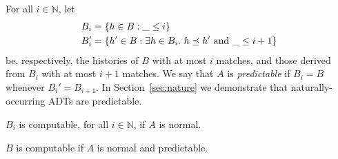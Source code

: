 For all $i \in \mathbb{N}$, let
\begin{align*}
  B_i &= {\{{ h \in B : \_ \le i }\}} \\
  B_i' &= {\{{ h' \in B :
    \exists h \in B_i.\ h \preceq h' \text{ and } \_ \le i+1
  }\}}
\end{align*}
be, respectively, the histories of $B$ with at most $i$ matches, and those
derived from $B_i$ with at most $i\!+\!1$ matches. We say that $A$ is
\emph{predictable} if $B_i = B$ whenever $B_i' = B_{i+1}$. In 
Section~\ref{sec:nature} we demonstrate that naturally-occurring ADTs are
predictable.

\begin{lemma}

  $B_i$ is computable, for all $i \in \mathbb{N}$, if $A$ is normal.

\end{lemma}

\begin{lemma}

  $B$ is computable if $A$ is normal and predictable.

\end{lemma}
